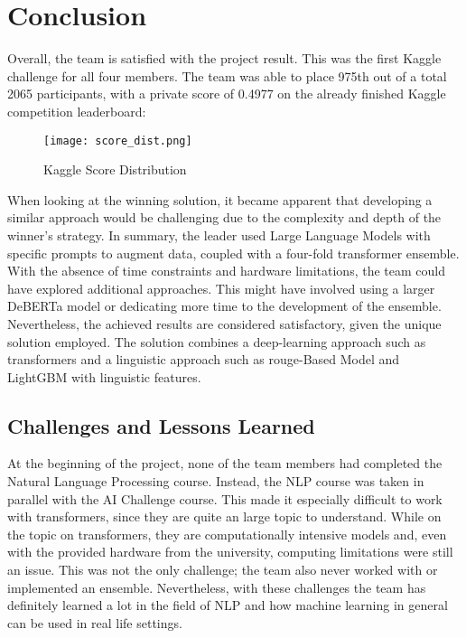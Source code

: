 \chapter{Conclusion}
Overall, the team is satisfied with the project result. This was the first Kaggle challenge for all four members.
The team was able to place 975th out of a total 2065 participants, with a private score of 0.4977 on the already finished Kaggle competition leaderboard:
\vspace{1em}


\begin{figure}[H]
    \texttt{[image: score\_dist.png]}
\caption{Kaggle Score Distribution}
\label{fig:score_dist}
\end{figure}
\vspace{1em}

\noindent When looking at the winning solution, it became apparent that developing a similar approach would be challenging due to the complexity and depth of the winner's strategy.
In summary, the leader used Large Language Models with specific prompts to augment data, coupled with a four-fold transformer ensemble.
\\

\noindent With the absence of time constraints and hardware limitations, the team could have explored additional approaches. This might have involved using a larger DeBERTa model or dedicating more time to the development of the ensemble. Nevertheless, the achieved results are considered satisfactory, given the unique solution employed.
The solution combines a deep-learning approach such as transformers and a linguistic approach 
such as \gls{rouge}-Based Model and LightGBM with linguistic features.

 





\section{Challenges and Lessons Learned}
At the beginning of the project, none of the team members had completed the Natural Language Processing course.
Instead, the NLP course was taken in parallel with the AI Challenge course.
This made it especially difficult to work with transformers, since they are quite an large topic to understand.
While on the topic on transformers, they are computationally intensive models and,
even with the provided hardware from the university, computing limitations were still an issue.
This was not the only challenge; the team also never worked with or implemented an ensemble.
Nevertheless, with these challenges the team has definitely learned a lot in the field of NLP and how machine learning in general can be used in real life settings.


